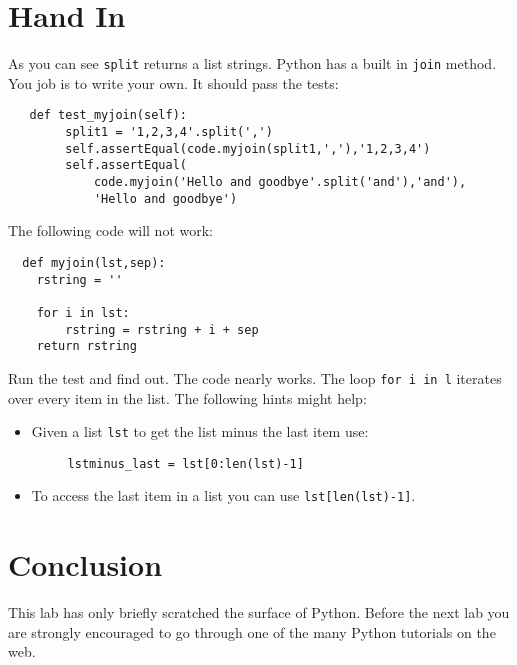 \documentclass{paper}
\begin{document}
\section{Hand In}
As you can see {\tt split} returns a list strings. Python has a built
in {\tt join} method. You job is to write your own. It should pass the
tests:
\begin{lstlisting}
   def test_myjoin(self):
        split1 = '1,2,3,4'.split(',')
        self.assertEqual(code.myjoin(split1,','),'1,2,3,4')
        self.assertEqual(
            code.myjoin('Hello and goodbye'.split('and'),'and'),
            'Hello and goodbye')
\end{lstlisting}

The following code will not work:
\begin{lstlisting}
  def myjoin(lst,sep):
    rstring = ''
    
    for i in lst:
        rstring = rstring + i + sep
    return rstring
\end{lstlisting}
Run the test and find out. The code nearly works. The loop {\tt for i
  in l} iterates over every item in the list. The following hints might help:
\begin{itemize}
\item Given a list {\tt lst} to get the list minus the last item use:
  \begin{lstlisting}
     lstminus_last = lst[0:len(lst)-1]
  \end{lstlisting}
\item To access the last item in a list you can use {\tt lst[len(lst)-1]}.
\end{itemize}


\section*{Conclusion}
This lab has only briefly scratched the surface of Python. Before the
next lab you are strongly encouraged to go through one of  the many
Python tutorials on the web. 
\end{document}
